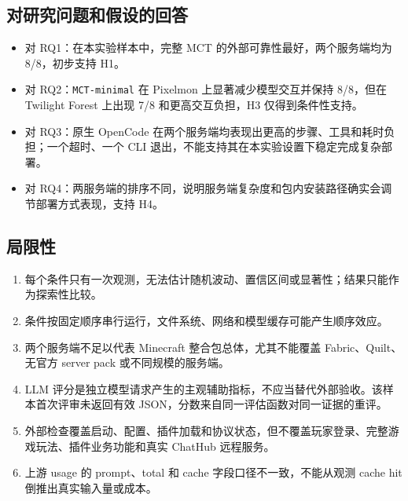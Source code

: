 \documentclass[UTF8,a4paper,11pt]{ctexart}
\newcommand{\mctminimal}{\texttt{MCT-minimal}}
\begin{document}
\subsection{对研究问题和假设的回答}
\begin{itemize}
  \item 对 RQ1：在本实验样本中，完整 MCT 的外部可靠性最好，两个服务端均为 8/8，初步支持 H1。
  \item 对 RQ2：\mctminimal{} 在 Pixelmon 上显著减少模型交互并保持 8/8，但在 Twilight Forest 上出现 7/8 和更高交互负担，H3 仅得到条件性支持。
  \item 对 RQ3：原生 OpenCode 在两个服务端均表现出更高的步骤、工具和耗时负担；一个超时、一个 CLI 退出，不能支持其在本实验设置下稳定完成复杂部署。
  \item 对 RQ4：两服务端的排序不同，说明服务端复杂度和包内安装路径确实会调节部署方式表现，支持 H4。
\end{itemize}

\subsection{局限性}
\begin{enumerate}
  \item 每个条件只有一次观测，无法估计随机波动、置信区间或显著性；结果只能作为探索性比较。
  \item 条件按固定顺序串行运行，文件系统、网络和模型缓存可能产生顺序效应。
  \item 两个服务端不足以代表 Minecraft 整合包总体，尤其不能覆盖 Fabric、Quilt、无官方 server pack 或不同规模的服务端。
  \item LLM 评分是独立模型请求产生的主观辅助指标，不应当替代外部验收。该样本首次评审未返回有效 JSON，分数来自同一评估函数对同一证据的重评。
  \item 外部检查覆盖启动、配置、插件加载和协议状态，但不覆盖玩家登录、完整游戏玩法、插件业务功能和真实 ChatHub 远程服务。
  \item 上游 usage 的 prompt、total 和 cache 字段口径不一致，不能从观测 cache hit 倒推出真实输入量或成本。
\end{enumerate}
\end{document}

